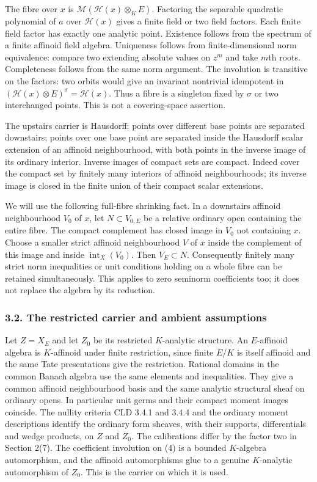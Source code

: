 \documentclass[
  11pt,
]{article}
\begin{document}
The fibre over \(x\) is \(\mathcal M(\mathcal H(x)\otimes_K E)\).
Factoring the separable quadratic polynomial of \(a\) over
\(\mathcal H(x)\) gives a finite field or two field factors. Each finite
field factor has exactly one analytic point. Existence follows from the
spectrum of a finite affinoid field algebra. Uniqueness follows from
finite-dimensional norm equivalence: compare two extending absolute
values on \(z^m\) and take \(m\)th roots. Completeness follows from the
same norm argument. The involution is transitive on the factors: two
orbits would give an invariant nontrivial idempotent in
\((\mathcal H(x)\otimes E)^\sigma=\mathcal H(x)\). Thus a fibre is a
singleton fixed by \(\sigma\) or two interchanged points. This is not a
covering-space assertion.

The upstairs carrier is Hausdorff: points over different base points are
separated downstairs; points over one base point are separated inside
the Hausdorff scalar extension of an affinoid neighbourhood, with both
points in the inverse image of its ordinary interior. Inverse images of
compact sets are compact. Indeed cover the compact set by finitely many
interiors of affinoid neighbourhoods; its inverse image is closed in the
finite union of their compact scalar extensions.

We will use the following full-fibre shrinking fact. In a downstairs
affinoid neighbourhood \(V_0\) of \(x\), let \(N\subset V_{0,E}\) be a
relative ordinary open containing the entire fibre. The compact
complement has closed image in \(V_0\) not containing \(x\). Choose a
smaller strict affinoid neighbourhood \(V\) of \(x\) inside the
complement of this image and inside \(\operatorname{int}_X(V_0)\). Then
\(V_E\subset N\). Consequently finitely many strict norm inequalities or
unit conditions holding on a whole fibre can be retained simultaneously.
This applies to zero seminorm coefficients too; it does not replace the
algebra by its reduction.

\subsubsection{3.2. The restricted carrier and ambient
assumptions}\label{the-restricted-carrier-and-ambient-assumptions}

Let \(Z=X_E\) and let \(Z_0\) be its restricted \(K\)-analytic
structure. An \(E\)-affinoid algebra is \(K\)-affinoid under finite
restriction, since finite \(E/K\) is itself affinoid and the same Tate
presentations give the restriction. Rational domains in the common
Banach algebra use the same elements and inequalities. They give a
common affinoid neighbourhood basis and the same analytic structural
sheaf on ordinary opens. In particular unit germs and their compact
moment images coincide. The nullity criteria CLD 3.4.1 and 3.4.4 and the
ordinary moment descriptions identify the ordinary form sheaves, with
their supports, differentials and wedge products, on \(Z\) and \(Z_0\).
The calibrations differ by the factor two in Section 2(7). The
coefficient involution on (4) is a bounded \(K\)-algebra automorphism,
and the affinoid automorphisms glue to a genuine \(K\)-analytic
automorphism of \(Z_0\). This is the carrier on which it is used.
\end{document}

